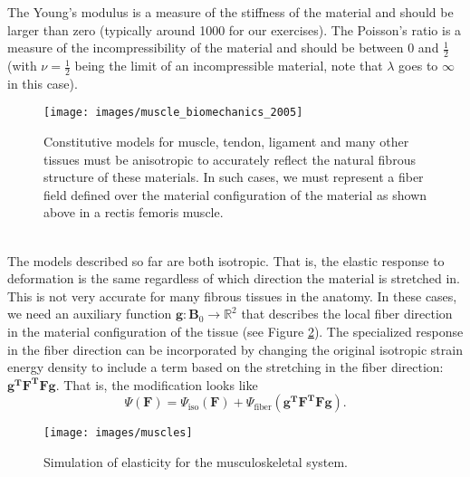\documentclass[article]{pcms-l}
\begin{document}
The Young's modulus is a measure of the stiffness of the material and should be larger than zero (typically around 1000 for our exercises). The Poisson's ratio is a measure of the incompressibility of the material and should be between 0 and $\frac{1}{2}$ (with $\nu=\frac{1}{2}$ being the limit of an incompressible material, note that $\lambda$ goes to $\infty$ in this case).\\
\begin{figure}
\texttt{[image: images/muscle\_biomechanics\_2005]}
\caption{Constitutive models for muscle, tendon, ligament and many other tissues must be anisotropic to accurately reflect the natural fibrous structure of these materials. In such cases, we must represent a fiber field defined over the material configuration of the material as shown above in a rectis femoris muscle.}
\label{fibers}
\end{figure}
\\
The models described so far are both isotropic. That is, the elastic response to deformation is the same regardless of which direction the material is stretched in. This is not very accurate for many fibrous tissues in the anatomy. In these cases, we need an auxiliary function $\mathbf{g}:\mathbf{B}_0\rightarrow\mathbb{R}^2$ that describes the local fiber direction in the material configuration of the tissue (see Figure \ref{fibers}). The specialized response in the fiber direction can be incorporated by changing the original isotropic strain energy density to include a term based on the stretching in the fiber direction: $\mathbf{g^TF^TFg}$. That is, the modification looks like
$$
\Psi(\mathbf{F})=\Psi_\textrm{iso}(\mathbf{F})+\Psi_\textrm{fiber}(\mathbf{g^TF^TFg}).
$$
\begin{figure}
\texttt{[image: images/muscles]}
\caption{Simulation of elasticity for the musculoskeletal system.}
\label{fibers}
\end{figure}
\end{document}
